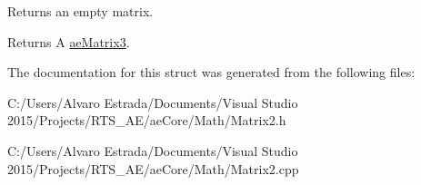 Returns an empty matrix. 

\begin{DoxyReturn}{Returns}
A \hyperlink{structae_core_1_1ae_matrix3}{ae\+Matrix3}. 
\end{DoxyReturn}


The documentation for this struct was generated from the following files\+:\begin{DoxyCompactItemize}
\item 
C\+:/\+Users/\+Alvaro Estrada/\+Documents/\+Visual Studio 2015/\+Projects/\+R\+T\+S\+\_\+\+A\+E/ae\+Core/\+Math/Matrix2.\+h\item 
C\+:/\+Users/\+Alvaro Estrada/\+Documents/\+Visual Studio 2015/\+Projects/\+R\+T\+S\+\_\+\+A\+E/ae\+Core/\+Math/Matrix2.\+cpp\end{DoxyCompactItemize}
